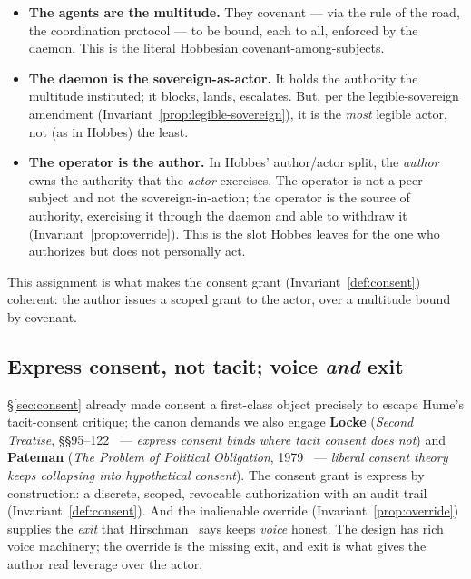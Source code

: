\documentclass[11pt,a4paper]{article}
\theoremstyle{definition}
\theoremstyle{plain}
\newcounter{protocol}[section]
\begin{document}
\begin{itemize}[leftmargin=1.2em]
\item \textbf{The agents are the multitude.} They covenant --- via the rule of the
road, the coordination protocol --- to be bound, each to all, enforced by the daemon.
This is the literal Hobbesian covenant-among-subjects.
\item \textbf{The daemon is the sovereign-as-actor.} It holds the authority the
multitude instituted; it blocks, lands, escalates. But, per the legible-sovereign
amendment (Invariant~\ref{prop:legible-sovereign}), it is the \emph{most} legible actor,
not (as in Hobbes) the least.
\item \textbf{The operator is the author.} In Hobbes' author/actor split, the
\emph{author} owns the authority that the \emph{actor} exercises. The operator is not
a peer subject and not the sovereign-in-action; the operator is the source of
authority, exercising it through the daemon and able to withdraw it
(Invariant~\ref{prop:override}). This is the slot Hobbes leaves for the one who authorizes
but does not personally act.
\end{itemize}

This assignment is what makes the consent grant (Invariant~\ref{def:consent}) coherent:
the author issues a scoped grant to the actor, over a multitude bound by covenant.



\subsection{Express consent, not tacit; voice \emph{and} exit}\label{sec:express}

\S\ref{sec:consent} already made consent a first-class object precisely to escape
Hume's tacit-consent critique; the canon demands we also engage \textbf{Locke}
(\emph{Second Treatise}, \S\S95--122~ --- \emph{express consent binds
where tacit consent does not}) and \textbf{Pateman} (\emph{The Problem of Political
Obligation}, 1979~ --- \emph{liberal consent theory keeps collapsing
into hypothetical consent}). The consent grant is express by construction: a discrete,
scoped, revocable authorization with an audit trail (Invariant~\ref{def:consent}). And the
inalienable override (Invariant~\ref{prop:override}) supplies the \emph{exit} that
Hirschman~ says keeps \emph{voice} honest. The design has rich
voice machinery; the override is the missing exit, and exit is what gives the author
real leverage over the actor.
\end{document}
